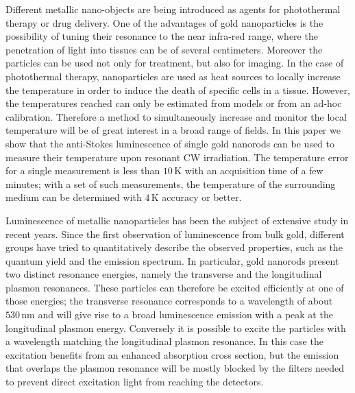\documentclass[journal=nalefd,manuscript=letter]{achemso}
\newcommand{\HI}[1]{{#1}} %
\newcommand{\K}{\ensuremath{\,\textrm{K}}}
\newcommand{\nm}{\ensuremath{\,\textrm{nm}}}
\begin{document}
Different metallic nano-objects are being introduced as agents for photothermal
therapy\cite{Huang2006,Huang2008} or drug delivery\cite{Kang2013}. One of the
advantages of gold nanoparticles is the possibility of tuning their resonance to
the near infra-red range, where the penetration of light into tissues can be of
several
centimeters\cite{Huang2006,Gobin2007,Hirsch2003,ONeal2004,Li2013c,Huang2008}.
Moreover the particles can be used not only for treatment, but also for
imaging\cite{Zhao2014a,Huang2006}. In the case of photothermal therapy,
nanoparticles are used as heat sources\cite{Gobin2007,Hirsch2003} to locally
increase the temperature in order to induce the death of specific cells in a
tissue\cite{Huang2008,Huang2006}. However, the temperatures
reached\cite{Donner2013} can only be estimated from models\cite{Zhao2014a} or
from an ad-hoc calibration. Therefore a method to simultaneously increase 
and monitor the local temperature will be of great interest in a
broad range of fields. In this paper we show that the anti-Stokes luminescence
of \HI{single} gold nanorods can be used to measure their temperature 
\HI{upon resonant CW irradiation. The temperature error for a single measurement
is less than $10\K$ with an acquisition time of a few minutes; with a set of such 
measurements, the temperature of the surrounding medium can be determined with 
$4\K$ accuracy or better.}

Luminescence of metallic nanoparticles has been the subject of extensive study in
recent years. Since the first observation of luminescence from bulk
gold\cite{Mooradian1969}, different groups have tried to quantitatively describe
the observed properties\HI{\cite{Mohamed2000,Beversluis2003a,Huang2014, hugall2015demonstrating,mertens2017light}}, 
such as the quantum yield\cite{Fang2012,Rao2015,Yorulmaz2012,Cheng2015,Dulkeith2004} and the
emission spectrum\cite{Link2010}. In particular, gold nanorods present two distinct
resonance energies, namely the transverse and the longitudinal plasmon
resonances. These particles can therefore be excited efficiently at one of those
energies; the transverse resonance corresponds to a wavelength of about $530\nm$ and will give
rise to a broad luminescence emission with a peak at the longitudinal plasmon energy.
Conversely it is possible to excite the particles with a wavelength matching
the longitudinal plasmon resonance. In this case the excitation benefits from
an enhanced absorption cross section, but the emission that overlaps the plasmon
resonance will be mostly blocked by the filters needed to prevent direct
excitation light from reaching the detectors.
\end{document}
